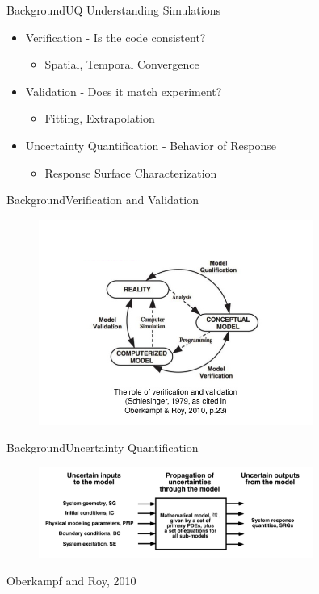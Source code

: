 \documentclass{beamer}
\begin{document}
\begin{frame}{Background}{UQ}
  Understanding Simulations
  \begin{itemize}
    \item Verification - Is the code consistent?
      \begin{itemize}
        \item Spatial, Temporal Convergence
      \end{itemize}
    \item Validation - Does it match experiment?
      \begin{itemize}
        \item Fitting, Extrapolation
      \end{itemize}
    \item Uncertainty Quantification - Behavior of Response
      \begin{itemize}
        \item Response Surface Characterization
      \end{itemize}
  \end{itemize}
\end{frame}

\begin{frame}{Background}{Verification and Validation}
  \vspace{-50pt}
  \begin{figure}[h!]
    \centering
      \includegraphics[width=0.8\textwidth]{../../graphics/v_and_v_1}
  \end{figure}
\end{frame}

\begin{frame}{Background}{Uncertainty Quantification}
  \vspace{-20pt}
  \begin{figure}[h!]
    \centering
      \includegraphics[width=0.8\textwidth]{../../graphics/v_and_v_uq}
  \end{figure}
  \hfill Oberkampf and Roy, 2010
\end{frame}
\end{document}
